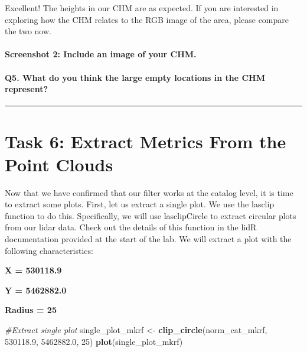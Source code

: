 \documentclass[
]{book}
\newenvironment{Shaded}{\begin{snugshade}}{\end{snugshade}}
\newcommand{\CommentTok}[1]{\textcolor[rgb]{0.56,0.35,0.01}{\textit{#1}}}
\newcommand{\DecValTok}[1]{\textcolor[rgb]{0.00,0.00,0.81}{#1}}
\newcommand{\FloatTok}[1]{\textcolor[rgb]{0.00,0.00,0.81}{#1}}
\newcommand{\FunctionTok}[1]{\textcolor[rgb]{0.13,0.29,0.53}{\textbf{#1}}}
\newcommand{\NormalTok}[1]{#1}
\newcommand{\OtherTok}[1]{\textcolor[rgb]{0.56,0.35,0.01}{#1}}
\begin{document}
Excellent! The heights in our CHM are as expected. If you are interested in exploring how the CHM relates to the RGB image of the area, please compare the two now.

\hypertarget{screenshot-2-include-an-image-of-your-chm.}{%
\paragraph*{Screenshot 2: Include an image of your CHM.}\label{screenshot-2-include-an-image-of-your-chm.}}

\hypertarget{q5.-what-do-you-think-the-large-empty-locations-in-the-chm-represent}{%
\paragraph*{Q5. What do you think the large empty locations in the CHM represent?}\label{q5.-what-do-you-think-the-large-empty-locations-in-the-chm-represent}}

\begin{center}\rule{0.5\linewidth}{0.5pt}\end{center}

\hypertarget{task-6-extract-metrics-from-the-point-clouds}{%
\section*{Task 6: Extract Metrics From the Point Clouds}\label{task-6-extract-metrics-from-the-point-clouds}}

Now that we have confirmed that our filter works at the catalog level, it is time to extract some plots. First, let us extract a single plot. We use the lasclip function to do this. Specifically, we will use lasclipCircle to extract circular plots from our lidar data. Check out the details of this function in the lidR documentation provided at the start of the lab. We will extract a plot with the following characteristics:

\textbf{X = 530118.9}

\textbf{Y = 5462882.0}

\textbf{Radius = 25}

\begin{Shaded}
\begin{Highlighting}[]
\CommentTok{\#Extract single plot}
\NormalTok{single\_plot\_mkrf }\OtherTok{\textless{}{-}} \FunctionTok{clip\_circle}\NormalTok{(norm\_cat\_mkrf, }\FloatTok{530118.9}\NormalTok{, }\FloatTok{5462882.0}\NormalTok{, }\DecValTok{25}\NormalTok{)}
\FunctionTok{plot}\NormalTok{(single\_plot\_mkrf) }
\end{Highlighting}
\end{Shaded}
\end{document}
